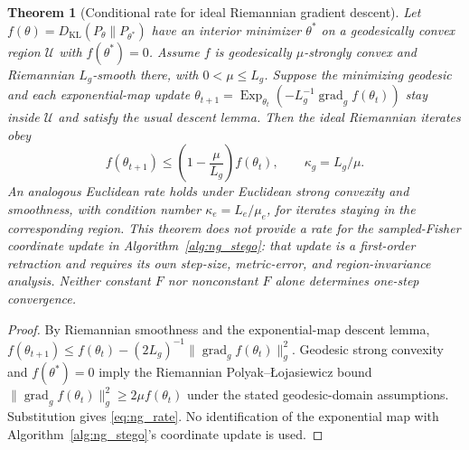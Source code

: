 \documentclass[a4paper,fleqn]{cas-dc}
\newtheorem{theorem}{Theorem}
\begin{document}
\begin{theorem}[Conditional rate for ideal Riemannian gradient descent]
  \label{thm:ng_convergence}
  Let $f(\theta)=D_{\mathrm{KL}}(P_\theta\|P_{\theta^*})$
  have an interior minimizer $\theta^*$ on a geodesically convex
  region $\mathcal U$ with $f(\theta^*)=0$.
  Assume $f$ is geodesically $\mu$-strongly convex and
  Riemannian $L_g$-smooth there, with $0<\mu\le L_g$.
  Suppose the minimizing geodesic and each exponential-map update
  $\theta_{t+1}=\operatorname{Exp}_{\theta_t}
    (-L_g^{-1}\operatorname{grad}_g f(\theta_t))$
  stay inside $\mathcal U$ and satisfy the usual descent lemma.
  Then the \emph{ideal Riemannian} iterates obey
  \begin{equation}
    f(\theta_{t+1})\le
    \left(1-\frac{\mu}{L_g}\right)f(\theta_t),
    \qquad \kappa_g=L_g/\mu.
    \label{eq:ng_rate}
  \end{equation}
  An analogous Euclidean rate holds under Euclidean strong convexity
  and smoothness, with condition number $\kappa_e=L_e/\mu_e$,
  for iterates staying in the corresponding region.
  This theorem does \emph{not} provide a rate for the sampled-Fisher
  \emph{coordinate update} in Algorithm~\ref{alg:ng_stego}:
  that update is a first-order retraction and requires its own
  step-size, metric-error, and region-invariance analysis.
  Neither constant $F$ nor nonconstant $F$ alone determines
  one-step convergence.
\end{theorem}

\begin{proof}
By Riemannian smoothness and the exponential-map descent lemma,
$f(\theta_{t+1})\le f(\theta_t)
 -(2L_g)^{-1}\|\operatorname{grad}_g f(\theta_t)\|_g^2$.
Geodesic strong convexity and $f(\theta^*)=0$ imply the
Riemannian Polyak--\L ojasiewicz bound
$\|\operatorname{grad}_g f(\theta_t)\|_g^2\ge2\mu f(\theta_t)$
under the stated geodesic-domain assumptions. Substitution gives
\eqref{eq:ng_rate}. No identification of the exponential map with
Algorithm~\ref{alg:ng_stego}'s coordinate update is used.
\end{proof}
\end{document}
